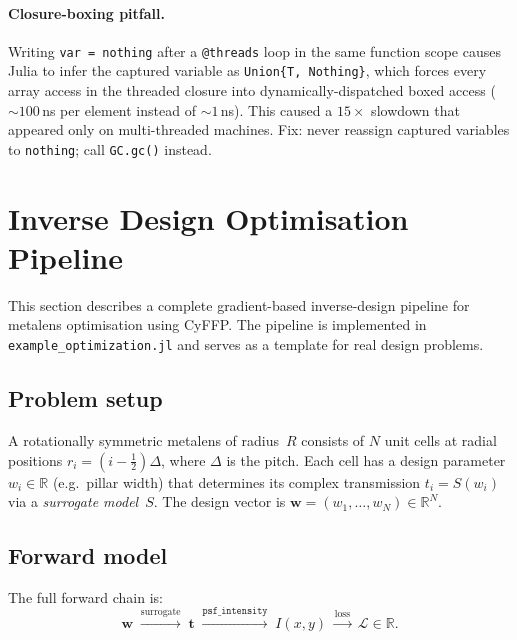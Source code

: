 \documentclass[11pt,a4paper]{article}
\begin{document}
\paragraph{Closure-boxing pitfall.}
Writing \texttt{var = nothing} after a \texttt{@threads} loop in the
same function scope causes Julia to infer the captured variable as
\texttt{Union\{T, Nothing\}}, which forces every array access in the
threaded closure into dynamically-dispatched boxed access
(${\sim}100$\,ns per element instead of ${\sim}1$\,ns).  This caused
a $15\times$ slowdown that appeared only on multi-threaded machines.
Fix: never reassign captured variables to \texttt{nothing}; call
\texttt{GC.gc()} instead.


\section{Inverse Design Optimisation Pipeline}
\label{sec:optimisation}

This section describes a complete gradient-based inverse-design pipeline
for metalens optimisation using CyFFP.  The pipeline is implemented in
\texttt{example\_optimization.jl} and serves as a template for real
design problems.

\subsection{Problem setup}

A rotationally symmetric metalens of radius~$R$ consists of $N$ unit cells
at radial positions $r_i = (i-\tfrac{1}{2})\Delta$, where $\Delta$ is the
pitch.  Each cell has a design parameter $w_i \in \mathbb{R}$ (e.g.\ pillar
width) that determines its complex transmission $t_i = S(w_i)$ via a
\emph{surrogate model}~$S$.  The design vector is
$\mathbf{w} = (w_1, \ldots, w_N) \in \mathbb{R}^N$.

\subsection{Forward model}

The full forward chain is:
\begin{equation}\label{eq:forward_chain}
  \mathbf{w}
  \;\xrightarrow{\text{surrogate}}\;
  \mathbf{t}
  \;\xrightarrow{\texttt{psf\_intensity}}\;
  I(x,y)
  \;\xrightarrow{\text{loss}}\;
  \mathcal{L} \in \mathbb{R}.
\end{equation}
\end{document}
